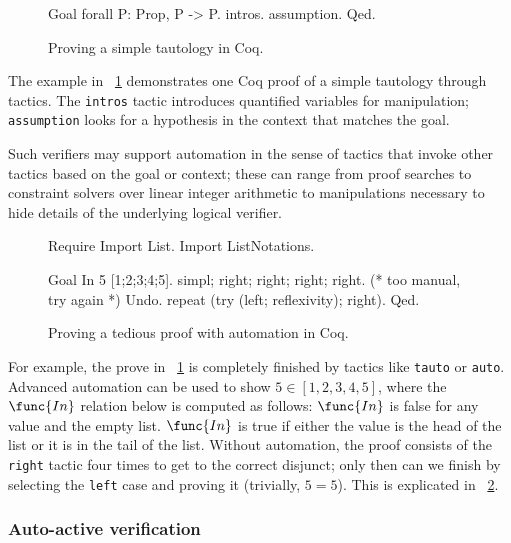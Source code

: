 \begin{figure}[ht]
\begin{coq_example}
Goal forall P: Prop, P -> P.
intros.
assumption.
Qed.
\end{coq_example}
    \caption{Proving a simple tautology in Coq.}\label{F:coq1}
\end{figure}

The example in \figurename~\ref{F:coq1} demonstrates one Coq proof of a
simple tautology through tactics. The \texttt{intros} tactic introduces
quantified variables for manipulation; \texttt{assumption} looks for a
hypothesis in the context that matches the goal.

Such verifiers may support automation in the sense of tactics that invoke other
tactics based on the goal or context; these can range from proof searches to
constraint solvers over linear integer arithmetic to manipulations necessary to
hide details of the underlying logical verifier.

\begin{figure}[ht]
\begin{coq_eval}
Require Import List.
Import ListNotations.
\end{coq_eval}
\begin{coq_example}
Goal In 5 [1;2;3;4;5].
simpl; right; right; right; right.
(* too manual, try again *) Undo.
repeat (try (left; reflexivity); right).
Qed.
\end{coq_example}
    \caption{Proving a tedious proof with automation in Coq.}\label{F:coq2}
\end{figure}

For example, the prove in \figurename~\ref{F:coq1} is completely finished by
tactics like \texttt{tauto} or \texttt{auto}. Advanced automation can be used to
show \(5 \in [1,2,3,4,5]\), where the \(\func{In}\) relation below is computed
as follows: \(\func{In}\) is false for any value and the empty list.
\(\func{In}\) is true if either the value is the head of the list or it is in
the tail of the list. Without automation, the proof consists of the
\texttt{right} tactic four times to get to the correct disjunct; only then can
we finish by selecting the \texttt{left} case and proving it (trivially, \(5 =
5\)). This is explicated in \figurename~\ref{F:coq2}.

\subsubsection{Auto-active verification}

